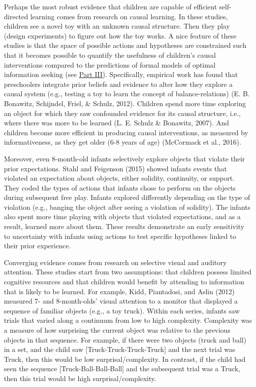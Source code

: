 \documentclass[english,floatsintext,man]{apa6}
\theoremstyle{definition}
\theoremstyle{definition}
\theoremstyle{definition}
\theoremstyle{remark}
\begin{document}
Perhaps the most robust evidence that children are capable of efficient
self-directed learning comes from research on causal learning. In these
studies, children see a novel toy with an unknown causal structure. Then
they play (design experiments) to figure out how the toy works. A nice
feature of these studies is that the space of possible actions and
hypotheses are constrained such that it becomes possible to quantify the
usefulness of children's causal interventions compared to the
predictions of formal models of optimal information seeking (see
\protect\hyperlink{p3}{Part III}). Specifically, empirical work has
found that preschoolers integrate prior beliefs and evidence to alter
how they explore a causal system (e.g., testing a toy to learn the
concept of balance-relations) (E. B. Bonawitz, Schijndel, Friel, \&
Schulz, 2012). Children spend more time exploring an object for which
they saw confounded evidence for its causal structure, i.e., where there
was more to be learned (L. E. Schulz \& Bonawitz, 2007). And children
become more efficient in producing causal interventions, as measured by
informativeness, as they get older (6-8 years of age) (McCormack et al.,
2016).

Moreover, even 8-month-old infants selectively explore objects that
violate their prior expectations. Stahl and Feigenson (2015) showed
infants events that violated an expectation about objects, either
solidity, continuity, or support. They coded the types of actions that
infants chose to perform on the objects during subsequent free play.
Infants explored differently depending on the type of violation (e.g.,
banging the object after seeing a violation of solidity). The infants
also spent more time playing with objects that violated expectations,
and as a result, learned more about them. These results demonstrate an
early sensitivity to uncertainty with infants using actions to test
specific hypotheses linked to their prior experience.

Converging evidence comes from research on selective visual and auditory
attention. These studies start from two assumptions: that children
possess limited cognitive resources and that children would benefit by
attending to information that is likely to be learned. For example,
Kidd, Piantadosi, and Aslin (2012) measured 7- and 8-month-olds' visual
attention to a monitor that displayed a sequence of familiar objects
(e.g., a toy truck). Within each series, infants saw trials that varied
along a continuum from low to high complexity. Complexity was a measure
of how surprising the current object was relative to the previous
objects in that sequence. For example, if there were two objects (truck
and ball) in a set, and the child saw {[}Truck-Truck-Truck-Truck{]} and
the next trial was Truck, then this would be low surprisal/complexity.
In contrast, if the child had seen the sequence
{[}Truck-Ball-Ball-Ball{]} and the subsequent trial was a Truck, then
this trial would be high surprisal/complexity.
\end{document}
